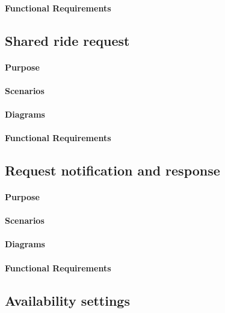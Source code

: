 \paragraph{Functional Requirements}

\subsection{Shared ride request}

\paragraph{Purpose}

\paragraph{Scenarios}

\paragraph{Diagrams}

\paragraph{Functional Requirements}

\subsection{Request notification and response}

\paragraph{Purpose}

\paragraph{Scenarios}

\paragraph{Diagrams}

\paragraph{Functional Requirements}

\subsection{Availability settings}

